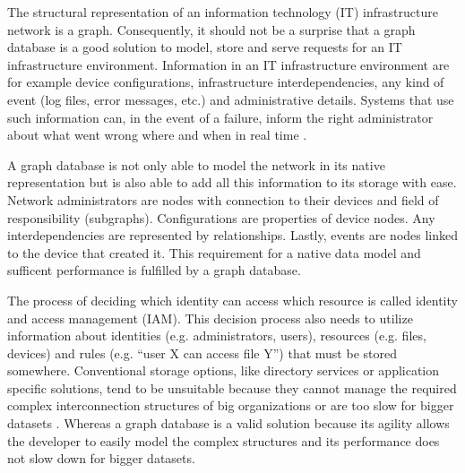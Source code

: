 
The structural representation of an information technology (IT) infrastructure network is a graph. Consequently, it should not be a surprise that a graph database is a good solution to model, store and serve requests for an IT infrastructure environment. Information in an IT infrastructure environment are for example device configurations, infrastructure interdependencies, any kind of event (log files, error messages, etc.) and administrative details. Systems that use such information can, in the event of a failure, inform the right administrator about what went wrong where and when in real time \autocite{neo4j:use_cases}.

A graph database is not only able to model the network in its native representation but is also able to add all this information to its storage with ease. Network administrators are nodes with connection to their devices and field of responsibility (subgraphs). Configurations are properties of device nodes. Any interdependencies are represented by relationships. Lastly, events are nodes linked to the device that created it. This requirement for a native data model and sufficent performance is fulfilled by a graph database.


The process of deciding which identity can access which resource is called identity and access management (IAM). This decision process also needs to utilize information about identities (e.g.  administrators, users), resources (e.g.  files, devices) and rules (e.g. “user X can access file Y”) that must be stored somewhere. Conventional storage options, like directory services or application specific solutions, tend to be unsuitable because they cannot manage the required complex interconnection structures of big organizations or are too slow for bigger datasets \autocite{neo4j:use_cases}.  Whereas a graph database is a valid solution because its agility allows the developer to easily model the complex structures and its performance does not slow down for bigger datasets.


